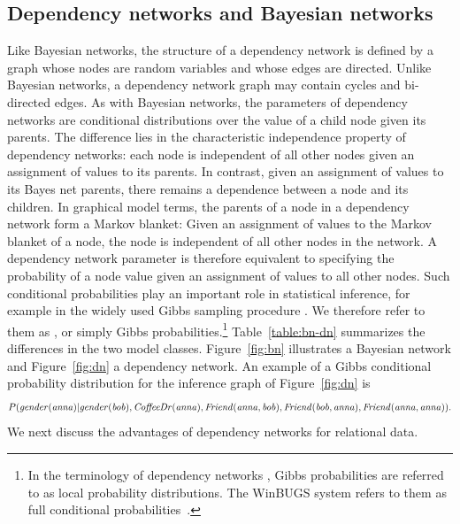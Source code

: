 \documentclass[twoside,11pt]{article}
\begin{document}
 \subsection{Dependency networks and Bayesian networks} Like Bayesian networks, the structure of a dependency network is defined by a graph whose nodes are random variables and whose edges are directed. Unlike Bayesian networks, a dependency network graph may contain cycles and bi-directed edges. As with Bayesian networks, the parameters of dependency networks are conditional distributions over the value of a child node given its parents. The difference lies in the characteristic independence property of dependency networks: each node is independent of all other nodes given an assignment of values to its parents. In contrast, given an assignment of values to its Bayes net parents, there remains a dependence between a node and its children. In graphical model terms, the parents of a node in a dependency network form a Markov blanket: Given an assignment of values to the Markov blanket of a node, the node is independent of all other nodes in the network. A dependency network parameter is therefore equivalent to specifying the probability of a node value given an assignment of values to all other nodes. Such conditional probabilities play an important role in statistical inference, for example in the widely used Gibbs sampling procedure \cite{Lunn2000}. We therefore refer to them as , or simply Gibbs probabilities.\footnote{In the terminology of dependency networks \cite{Heckerman2000},  Gibbs  probabilities are referred to as local probability distributions. The WinBUGS system refers to them as full conditional probabilities~\cite{Lunn2000}.} Table~\ref{table:bn-dn} summarizes the differences in the two model classes. Figure~\ref{fig:bn} illustrates a Bayesian network and Figure~\ref{fig:dn} a dependency network. An example of a Gibbs conditional probability distribution for the inference graph of Figure~\ref{fig:dn} is $$P(\it{gender}(anna)|\it{gender(bob)}, \it{CoffeeDr(anna)}, \it{Friend(anna,bob)},\it{Friend(bob,anna)},\it{Friend(anna,anna)}).$$ We next discuss the advantages of dependency networks for relational data.
 
\end{document}

